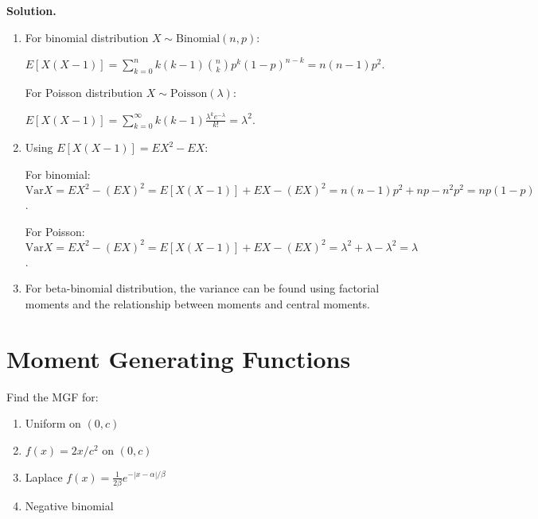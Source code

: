 \noindent\textbf{Solution.}
\begin{enumerate}[label=(\alph*)]
    \item For binomial distribution $X \sim \text{Binomial}(n,p)$:
    
    $E[X(X-1)] = \sum_{k=0}^n k(k-1)\binom{n}{k}p^k(1-p)^{n-k} = n(n-1)p^2$.
    
    For Poisson distribution $X \sim \text{Poisson}(\lambda)$:
    
    $E[X(X-1)] = \sum_{k=0}^\infty k(k-1)\frac{\lambda^k e^{-\lambda}}{k!} = \lambda^2$.
    
    \item Using $E[X(X-1)] = EX^2 - EX$:
    
    For binomial: $\text{Var}X = EX^2 - (EX)^2 = E[X(X-1)] + EX - (EX)^2 = n(n-1)p^2 + np - n^2p^2 = np(1-p)$.
    
    For Poisson: $\text{Var}X = EX^2 - (EX)^2 = E[X(X-1)] + EX - (EX)^2 = \lambda^2 + \lambda - \lambda^2 = \lambda$.
    
    \item For beta-binomial distribution, the variance can be found using factorial moments and the relationship between moments and central moments.
\end{enumerate}

\section{Moment Generating Functions}

\begin{problembox}
Find the MGF for:
\begin{enumerate}[label=(\alph*)]
    \item Uniform on $(0,c)$
    \item $f(x)=2x/c^2$ on $(0,c)$
    \item Laplace $f(x)=\frac{1}{2\beta}e^{-|x-\alpha|/\beta}$
    \item Negative binomial
\end{enumerate}
\end{problembox}

